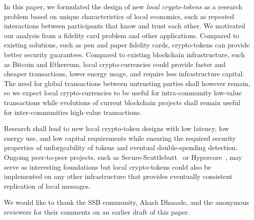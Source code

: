\documentclass[sigconf,9pt]{acmart}
\begin{document}
In this paper, we formulated the design of new \textit{local crypto-tokens} as a research problem based on unique characteristics of local economics, such as repeated interactions between participants that know and trust each other. We motivated our analysis from a fidelity card problem and other applications. Compared to existing solutions, such as pen and paper fidelity cards, crypto-tokens can provide better security guarantees. Compared to existing blockchain infrastructure, such as Bitcoin and Ethereum, local crypto-currencies could provide faster and cheaper transactions, lower energy usage, and require less infrastructure capital. The need for global transactions between untrusting parties shall however remain, so we expect local crypto-currencies to be useful for intra-community low-value transactions while evolutions of current blockchain projects shall remain useful for inter-communities high-value transactions.

Research shall lead to new local crypto-token designs with low latency, low energy use, and low capital requirements while ensuring the required security properties of unforgeability of tokens and eventual double-spending detection. Ongoing peer-to-peer projects, such as Secure-Scuttlebutt~\cite{tarr2019ssb} or Hypercore~\cite{hypercore}, may serve as interesting foundations but local crypto-tokens could also be implemented on any other infrastructure that provides eventually consistent replication of local messages.


\begin{acks}

We would like to thank the SSB community, Akash Dhasade, and the anonymous reviewers for their comments on an earlier draft of this paper.

\end{acks}



\end{document}
